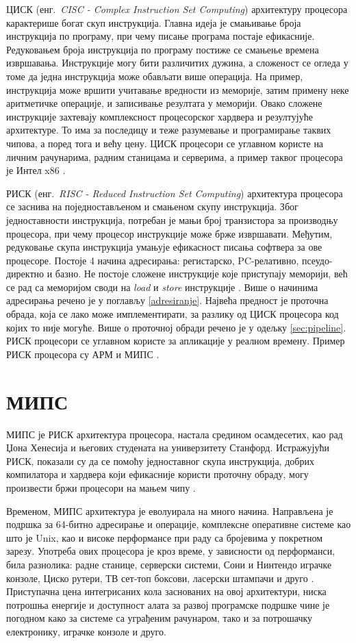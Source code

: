 \documentclass[12pt,oneside]{memoir}
\begin{document}
ЦИСК (енг.~\textit{CISC - Complex Instruction Set Computing}) архитектуру процесора карактерише богат скуп инструкција. Главна идеја је смањивање броја инструкција по програму, при чему писање програма постаје ефикасније. Редуковањем броја инструкција по програму постиже се смањење времена извршавања. Инструкције могу бити различитих дужина, а сложеност се огледа у томе да једна инструкција може обављати више операција. На пример, инструкција може вршити учитавање вредности из меморије, затим примену неке аритметичке операције, и записивање резултата у меморији. Овако сложене инструкције захтевају комплексност процесорског хардвера и резултујуће архитектуре. То има за последицу и теже разумевање и програмирање таквих чипова, а поред тога и већу цену.
ЦИСК процесори се углавном користе на личним рачунарима, радним станицама и серверима, а пример таквог процесора је Интел x86 \cite{mips} \cite{risc_vs_cisc}.

РИСК (енг.~\textit{RISC - Reduced Instruction Set Computing}) архитектура процесора се заснива на поједностављеном и смањеном скупу инструкција. Због једноставности инструкција, потребан је мањи број транзистора за производњу процесора, при чему процесор инструкције може брже извршавати. Међутим, редуковање скупа инструкција умањује ефикасност писања софтвера за ове процесоре. 
Постоје 4 начина адресирања: регистарско, PC-релативно, псеудо-директно и базно. Не постоје сложене инструкције које приступају меморији, већ се рад са меморијом своди на \textit{load} и \textit{store} инструкције \cite{mips} \cite{risc_vs_cisc}. Више о начинима адресирања речено је у поглављу \ref{adresiranje}.
Највећа предност је проточна обрада, која се лако може имплементирати, за разлику од ЦИСК процесора код којих то није могуће. Више о проточној обради речено је у одељку \ref{sec:pipeline}. РИСК процесори се углавном користе за апликације у реалном времену. Пример РИСК процесора су АРМ и МИПС .

\section{МИПС}
МИПС је РИСК архитектура процесора, настала средином осамдесетих, као рад Џона Хенесија и његових студената на универзитету Станфорд. Истражујући РИСК, показали су да се помоћу једноставног скупа инструкција, добрих компилатора и хардвера који ефикасније користи проточну обраду, могу произвести бржи процесори на мањем чипу \cite{mips}.

Временом, МИПС архитектура је еволуирала на много начина. Направљена је подршка за 64-битно адресирање и операције, комплексне оперативне системе као што је Unix, као и високе перформансе при раду са бројевима у покретном зарезу. Употреба ових процесора је кроз време, у зависности од перформанси, била разнолика: радне станице, серверски системи, Сони и Нинтендо играчке конзоле, Циско рутери, ТВ сет-топ боксови, ласерски штампачи и друго \cite{mips}.
Приступачна цена интегрисаних кола заснованих на овој архитектури, ниска потрошња енергије и доступност алата за развој програмске подршке чине је погодном како за системе са уграђеним рачунаром, тако и за потрошачку електронику, играчке конзоле и друго.
\end{document}
